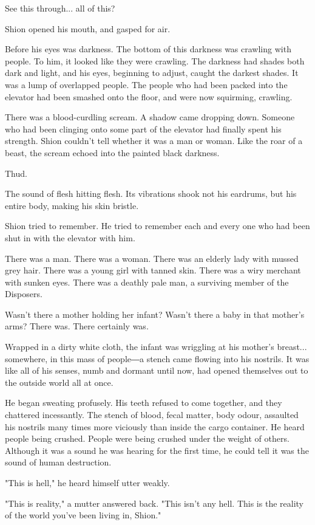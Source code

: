 See this through... all of this?

Shion opened his mouth, and gasped for air.

Before his eyes was darkness. The bottom of this darkness was crawling
with people. To him, it looked like they were crawling. The darkness had
shades both dark and light, and his eyes, beginning to adjust, caught
the darkest shades. It was a lump of overlapped people. The people who
had been packed into the elevator had been smashed onto the floor, and
were now squirming, crawling.

There was a blood-curdling scream. A shadow came dropping down. Someone
who had been clinging onto some part of the elevator had finally spent
his strength. Shion couldn't tell whether it was a man or woman. Like
the roar of a beast, the scream echoed into the painted black darkness.

Thud.

The sound of flesh hitting flesh. Its vibrations shook not his eardrums,
but his entire body, making his skin bristle.

Shion tried to remember. He tried to remember each and every one who had
been shut in with the elevator with him.

There was a man. There was a woman. There was an elderly lady with
mussed grey hair. There was a young girl with tanned skin. There was a
wiry merchant with sunken eyes. There was a deathly pale man, a
surviving member of the Disposers.

Wasn't there a mother holding her infant? Wasn't there a baby in that
mother's arms? There was. There certainly was.

Wrapped in a dirty white cloth, the infant was wriggling at his mother's
breast... somewhere, in this mass of people―a stench came flowing into
his nostrils. It was like all of his senses, numb and dormant until now,
had opened themselves out to the outside world all at once.

He began sweating profusely. His teeth refused to come together, and
they chattered incessantly. The stench of blood, fecal matter, body
odour, assaulted his nostrils many times more viciously than inside the
cargo container. He heard people being crushed. People were being
crushed under the weight of others. Although it was a sound he was
hearing for the first time, he could tell it was the sound of human
destruction.

"This is hell," he heard himself utter weakly.

"This is reality," a mutter answered back. "This isn't any hell. This is
the reality of the world you've been living in, Shion."

